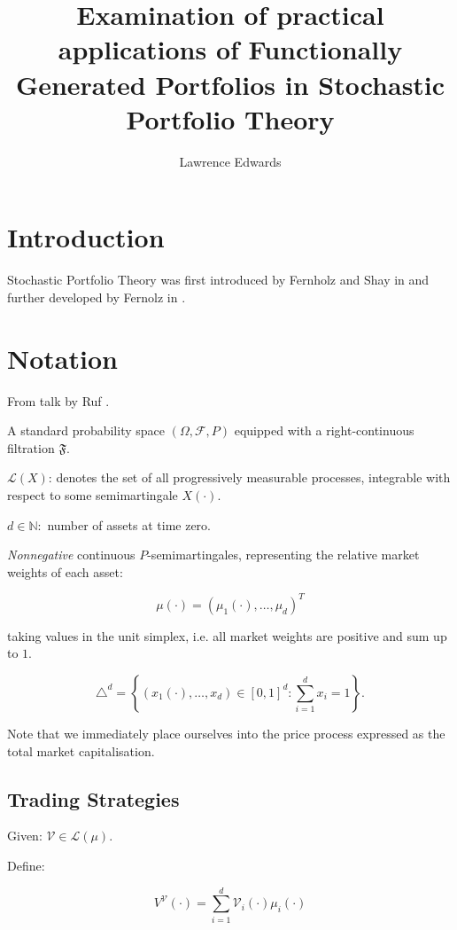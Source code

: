 \documentclass[british,english]{amsart}
\numberwithin{equation}{section}
\numberwithin{figure}{section}
\theoremstyle{plain}
\theoremstyle{definition}
\theoremstyle{plain}
\theoremstyle{plain}
\theoremstyle{plain}
\renewcommand{\L}{\mathcal{L}}
\begin{document}
\title{Examination of practical applications of Functionally Generated 
Portfolios in Stochastic Portfolio Theory}
\author{Lawrence Edwards}
\maketitle

\tableofcontents{}

\section{Introduction}

Stochastic Portfolio Theory was first introduced by Fernholz and Shay in 
\cite{fernholz1982} and further developed by Fernolz in \cite{fernholz2002}.

\section{Notation}

From talk by Ruf \cite{karatzas2017}.

A standard probability space $(\Omega,\mathcal{F},P)$ equipped with a 
right-continuous filtration $\mathfrak{F}$.


$\L(X)$: denotes the set of all progressively measurable processes, 
integrable with respect to some semimartingale $X(\cdot)$.

$d\in\mathbb{N}:$ number of assets at time zero.

\textit{Nonnegative} continuous $P$-semimartingales, representing the relative market 
weights of each asset:

\begin{equation}
	\mu(\cdot) = \left( \mu_{1}(\cdot),\ldots,\mu_{d} \right)^{T}
\end{equation}

taking values in the unit simplex, i.e. all market weights are positive and sum 
up to $1$.

\begin{equation}
\triangle^{d}=\left\{(x_{1}(\cdot),\ldots,x_{d})\in[0,1]^{d}:\sum_{i=1}^{d}x_{i}=1\right\}.
\end{equation}

Note that we immediately place ourselves into the price process expressed as the 
total market capitalisation.

\subsection{Trading Strategies}

\newcommand{\V}{\mathcal{V}}

Given: $\V\in\L(\mu)$.

Define:

\begin{equation}
	V^{\V}(\cdot)=\sum_{i=1}^{d}\V_{i}(\cdot)\mu_{i}(\cdot)
\end{equation}

\printbibliography
\end{document}

